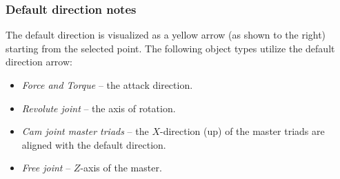 \clearpage

\subsubsection{Default direction notes}

\noindent
\begin{minipage}{0.7\textwidth}
  \raggedright
  The default direction is visualized as a yellow arrow (as shown to the right)
  starting from the selected point.
  The following object types utilize the default direction arrow:

  \begin{itemize}
  \item{\sl Force and Torque} -- the attack direction.
  \item{\sl Revolute joint} -- the axis of rotation.
  \item{\sl Cam joint master triads} -- the $X$-direction (up)
    of the master triads are aligned with the default direction.
  \item{\sl Free joint} -- $Z$-axis of the master.
  \end{itemize}
\end{minipage}%
